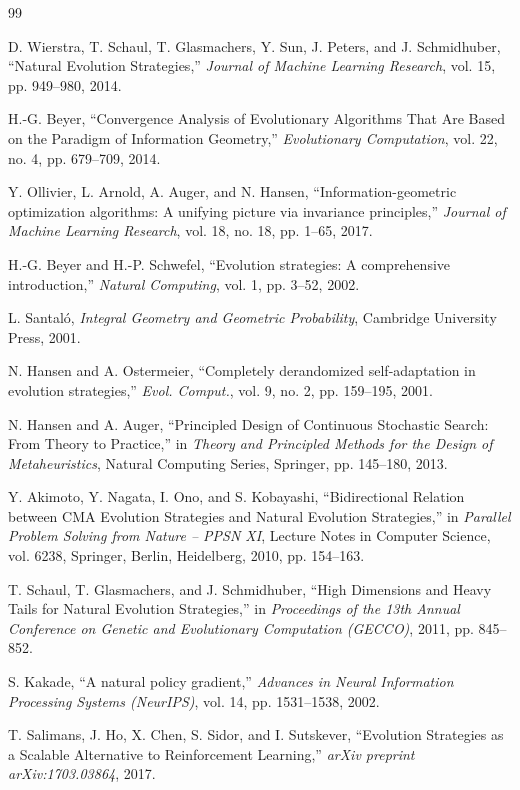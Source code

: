 \documentclass{article}
\theoremstyle{plain}%
\theoremstyle{definition}
\theoremstyle{remark}
\theoremstyle{prop}
\begin{document}
\begin{thebibliography}{99}

D. Wierstra, T. Schaul, T. Glasmachers, Y. Sun, J. Peters, and J. Schmidhuber, ``Natural Evolution Strategies,'' \emph{Journal of Machine Learning Research}, vol. 15, pp. 949--980, 2014.

H.-G. Beyer, ``Convergence Analysis of Evolutionary Algorithms That Are Based on the Paradigm of Information Geometry,'' \emph{Evolutionary Computation}, vol. 22, no. 4, pp. 679--709, 2014.

Y. Ollivier, L. Arnold, A. Auger, and N. Hansen, ``Information-geometric optimization algorithms: A unifying picture via invariance principles,'' \emph{Journal of Machine Learning Research}, vol. 18, no. 18, pp. 1--65, 2017.

H.-G. Beyer and H.-P. Schwefel, ``Evolution strategies: A comprehensive introduction,'' \emph{Natural Computing}, vol. 1, pp. 3--52, 2002.

L. Santaló, \emph{Integral Geometry and Geometric Probability}, Cambridge University Press, 2001.

N. Hansen and A. Ostermeier, ``Completely derandomized self-adaptation in evolution strategies,'' \emph{Evol. Comput.}, vol. 9, no. 2, pp. 159--195, 2001.

N. Hansen and A. Auger, ``Principled Design of Continuous Stochastic Search: From Theory to Practice,'' in \emph{Theory and Principled Methods for the Design of Metaheuristics}, Natural Computing Series, Springer, pp. 145--180, 2013.

Y. Akimoto, Y. Nagata, I. Ono, and S. Kobayashi, ``Bidirectional Relation between CMA Evolution Strategies and Natural Evolution Strategies,'' in \emph{Parallel Problem Solving from Nature -- PPSN XI}, Lecture Notes in Computer Science, vol. 6238, Springer, Berlin, Heidelberg, 2010, pp. 154--163.

T. Schaul, T. Glasmachers, and J. Schmidhuber, ``High Dimensions and Heavy Tails for Natural Evolution Strategies,'' in \emph{Proceedings of the 13th Annual Conference on Genetic and Evolutionary Computation (GECCO)}, 2011, pp. 845--852.

S. Kakade, ``A natural policy gradient,'' \emph{Advances in Neural Information Processing Systems (NeurIPS)}, vol. 14, pp. 1531--1538, 2002.

T. Salimans, J. Ho, X. Chen, S. Sidor, and I. Sutskever, ``Evolution Strategies as a Scalable Alternative to Reinforcement Learning,'' \emph{arXiv preprint arXiv:1703.03864}, 2017.


\end{thebibliography}
\end{document}
